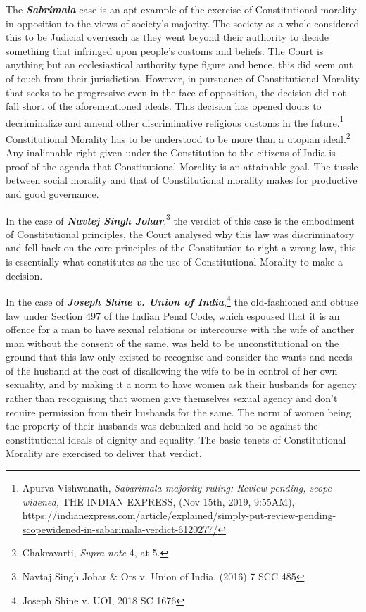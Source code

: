 \begin{multicols}{2}
\noi
The \textbf{\textit{Sabrimala}} case is an apt example of the exercise of Constitutional morality in opposition
to the views of society’s majority. The society as a whole considered this to be Judicial
overreach as they went beyond their authority to decide something that infringed upon
people’s customs and beliefs. The Court is anything but an ecclesiastical authority type figure
and hence, this did seem out of touch from their jurisdiction. However, in pursuance of
Constitutional Morality that seeks to be progressive even in the face of opposition, the 
decision did not fall short of the aforementioned ideals. This decision has opened doors to
decriminalize and amend other discriminative religious customs in the future.\footnote{ Apurva Vishwanath, \textit{Sabarimala majority ruling: Review pending, scope widened,} THE INDIAN EXPRESS,
(Nov 15th, 2019, 9:55AM),  \url{https://indianexpress.com/article/explained/simply-put-review-pending-scopewidened-in-sabarimala-verdict-6120277/}} Constitutional Morality has to be understood to be more than a utopian ideal.\footnote{Chakravarti, \textit{Supra note} 4, at 5.} Any inalienable right given under the Constitution to the citizens of India is proof of the agenda that Constitutional
Morality is an attainable goal. The tussle between social morality and that of Constitutional
morality makes for productive and good governance.

\noi
In the case of \textbf{\textit{Navtej Singh Johar}},\footnote{Navtaj Singh Johar \& Ors v. Union of India, (2016) 7 SCC 485} the verdict of this case is the embodiment of
Constitutional principles, the Court analysed why this law was discriminatory and fell back
on the core principles of the Constitution to right a wrong law, this is essentially what
constitutes as the use of Constitutional Morality to make a decision.

\vspace{-.1cm}

\noi
In the case of \textbf{\textit{Joseph Shine v. Union of India}},\footnote{Joseph Shine v. UOI, 2018 SC 1676} the old-fashioned and obtuse law under
Section 497 of the Indian Penal Code, which espoused that it is an offence for a man to have
sexual relations or intercourse with the wife of another man without the consent of the same,
was held to be unconstitutional on the ground that this law only existed to recognize and
consider the wants and needs of the husband at the cost of disallowing the wife to be in
control of her own sexuality, and by making it a norm to have women ask their husbands for
agency rather than recognising that women give themselves sexual agency and don’t require
permission from their husbands for the same. The norm of women being the property of their
husbands was debunked and held to be against the constitutional ideals of dignity and
equality. The basic tenets of Constitutional Morality are exercised to deliver that verdict.


\end{multicols}
